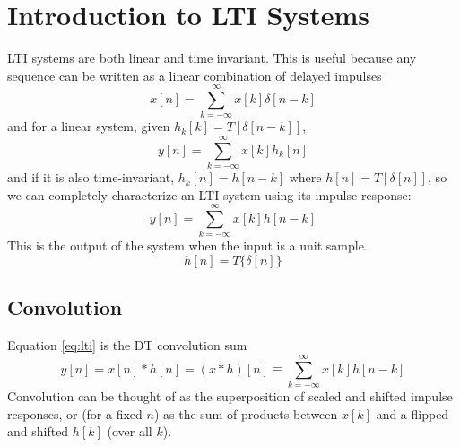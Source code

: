 \documentclass{article}
\begin{document}
\section{Introduction to LTI Systems}
LTI systems are both linear and time invariant. This is useful because any sequence can be written as a linear combination of delayed impulses
$$x[n] = \sum_{k=-\infty}^\infty x[k]\delta[n-k]$$
and for a linear system, given $h_k[k] = T[\delta[n-k]]$,
$$y[n] = \sum_{k=-\infty}^\infty x[k]h_k[n]$$
and if it is also time-invariant, $h_k[n] = h[n-k]$ where $h[n]=T[\delta[n]]$, so we can completely characterize an LTI system using its impulse response:
\begin{equation}\label{eq:lti}
       y[n] = \sum_{k=-\infty}^\infty x[k]h[n-k]
\end{equation}
This is the output of the system when the input is a unit sample.
\begin{equation}
	   h[n] = T\{\delta[n]\}
\end{equation}

\subsection{Convolution}
Equation \ref{eq:lti} is the DT convolution sum
\begin{equation}
    y[n]= x[n]*h[n] =(x * h)[n] \equiv \sum_{k=-\infty}^\infty x[k]h[n-k]
\end{equation}
Convolution can be thought of as the superposition of scaled and shifted impulse responses, or (for a fixed $n$) as the sum of products between $x[k]$ and a flipped and shifted $h[k]$ (over all $k$).
\end{document}
